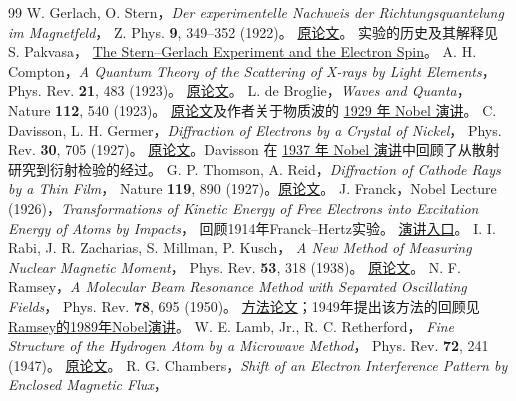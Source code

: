 \begin{thebibliography}{99}
    W. Gerlach, O. Stern，\textit{Der experimentelle Nachweis der Richtungsquantelung im Magnetfeld}，
    Z. Phys. \textbf{9}, 349--352 (1922)。
    \href{https://doi.org/10.1007/BF01326983}{原论文}。
    实验的历史及其解释见 S. Pakvasa，
    \href{https://arxiv.org/abs/1805.09412}{The Stern--Gerlach Experiment and the Electron Spin}。
    A. H. Compton，\textit{A Quantum Theory of the Scattering of X-rays by Light Elements}，
    Phys. Rev. \textbf{21}, 483 (1923)。
    \href{https://doi.org/10.1103/PhysRev.21.483}{原论文}。
    L. de Broglie，\textit{Waves and Quanta}，Nature \textbf{112}, 540 (1923)。
    \href{https://doi.org/10.1038/112540a0}{原论文}及作者关于物质波的
    \href{https://www.nobelprize.org/uploads/2016/04/broglie-lecture.pdf}{1929 年 Nobel 演讲}。
    C. Davisson, L. H. Germer，\textit{Diffraction of Electrons by a Crystal of Nickel}，
    Phys. Rev. \textbf{30}, 705 (1927)。
    \href{https://doi.org/10.1103/PhysRev.30.705}{原论文}。Davisson 在
    \href{https://www.nobelprize.org/uploads/2018/06/davisson-lecture.pdf}{1937 年 Nobel 演讲}中回顾了从散射研究到衍射检验的经过。
    G. P. Thomson, A. Reid，\textit{Diffraction of Cathode Rays by a Thin Film}，
    Nature \textbf{119}, 890 (1927)。\href{https://doi.org/10.1038/119890a0}{原论文}。
    J. Franck，Nobel Lecture (1926)，\textit{Transformations of Kinetic Energy of Free Electrons into Excitation Energy of Atoms by Impacts}，
    回顾1914年Franck--Hertz实验。
    \href{https://www.nobelprize.org/uploads/2018/06/franck-lecture.pdf}{演讲入口}。
    I. I. Rabi, J. R. Zacharias, S. Millman, P. Kusch，
    \textit{A New Method of Measuring Nuclear Magnetic Moment}，
    Phys. Rev. \textbf{53}, 318 (1938)。
    \href{https://doi.org/10.1103/PhysRev.53.318}{原论文}。
    N. F. Ramsey，\textit{A Molecular Beam Resonance Method with Separated Oscillating Fields}，
    Phys. Rev. \textbf{78}, 695 (1950)。
    \href{https://doi.org/10.1103/PhysRev.78.695}{方法论文}；1949年提出该方法的回顾见
    \href{https://www.nobelprize.org/uploads/2018/06/ramsey-lecture.pdf}{Ramsey的1989年Nobel演讲}。
    W. E. Lamb, Jr., R. C. Retherford，
    \textit{Fine Structure of the Hydrogen Atom by a Microwave Method}，
    Phys. Rev. \textbf{72}, 241 (1947)。
    \href{https://doi.org/10.1103/PhysRev.72.241}{原论文}。
    R. G. Chambers，\textit{Shift of an Electron Interference Pattern by Enclosed Magnetic Flux}，

\end{thebibliography}
